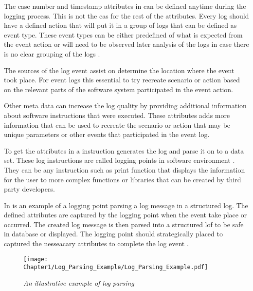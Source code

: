 The case number and timestamp attributes in  can be defined anytime during the logging process. This is not the cas for the rest of the attributes. Every log should have a defined action that will put it in a group of logs that can be defined as event type. These event types can be either predefined of what is expected from the event action or will need to be observed later analysis of the logs in case there is no clear grouping of the logs \cite{Bekeneva2020a, Fedaghi2010}.\par The sources of the log event assist on determine the location where the event took place. For event logs this essential to try recreate scenario or action based on the relevant parts of the software system participated in the event action.\par Other meta data can increase the log quality by providing additional information about software instructions that were executed. These attributes adds more information that can be used to recreate the scenario or action that may be unique parameters or other events that participated in the event log.\par To get the attributes in  a instruction generates the log and parse it on to a data set. These log instructions are called logging points in software environment \cite{Pecchia2015, Zhu2015}. They can be any instruction such as print function that displays the information for the user to more complex functions or libraries that can be created by third party developers.

\clearpage

In  is an example of a logging point parsing a log message in a structured log. The defined attributes are captured by the logging point when the event take place or occurred. The created log message is then parsed into a structured lof to be safe in database or displayed. The logging point should strategically placed to captured the nesseacary attributes to complete the log event \cite{Fedaghi2010}.

\begin{figure}[!htb] %
	\centering %
	\texttt{[image: Chapter1/Log\_Parsing\_Example/Log\_Parsing\_Example.pdf]}
	\caption[An illustrative example of log parsing]
	{\textit{An illustrative example of log parsing \cite{Zhu2019}}} \label{fig:Log_Parsing}
\end{figure}

